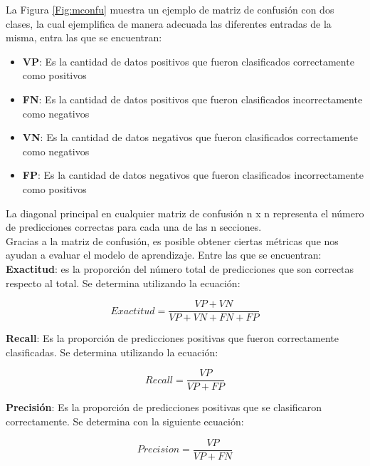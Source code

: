 La Figura \ref{Fig:mconfu} muestra un ejemplo de matriz de confusión con dos clases, la cual ejemplifica de
manera adecuada las diferentes entradas de la misma, entra las que se encuentran:


\begin{itemize}

	\item \textbf{VP}: Es la cantidad de datos positivos que fueron clasificados correctamente como positivos 
	\item \textbf{FN}: Es la cantidad de datos positivos que fueron clasificados incorrectamente como negativos
	\item \textbf{VN}: Es la cantidad de datos negativos que fueron clasificados correctamente como negativos
	\item \textbf{FP}: Es la cantidad de datos negativos que fueron clasificados incorrectamente como positivos
	
\end{itemize}

La diagonal principal en cualquier matriz de confusión n x n representa el número de predicciones
correctas para cada una de las n secciones.\\

Gracias a la matriz de confusión, es posible obtener ciertas métricas que nos ayudan a evaluar el modelo
de aprendizaje. Entre las que se encuentran:\\


\textbf{Exactitud}: es la proporción del número total de predicciones que son correctas respecto al total.
Se determina utilizando la ecuación:

\begin{equation}\label{eq:1}
	Exactitud = \frac{VP+VN}{VP+VN+FN+FP}
\end{equation}

\textbf{Recall}: Es la proporción de predicciones positivas que fueron correctamente clasificadas. Se determina
utilizando la ecuación:


\begin{equation}\label{eq:2}
	Recall = \frac{VP}{VP+FP}
\end{equation}


\textbf{Precisión}: Es la proporción de predicciones positivas que se clasificaron correctamente. Se determina
con la siguiente ecuación:


\begin{equation}\label{eq:3}
	Precision = \frac{VP}{VP+FN}
\end{equation}


